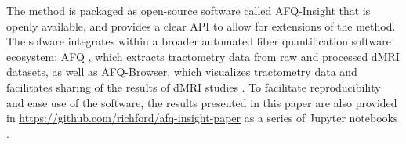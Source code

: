 The method is packaged as open-source software called AFQ-Insight that is openly
available, and provides a clear API to allow for extensions of the method. The
sofware integrates within a broader automated fiber quantification software
ecosystem: AFQ \cite{yeatman2012tract}, which extracts tractometry data from raw
and processed dMRI datasets, as well as AFQ-Browser, which visualizes
tractometry data and facilitates sharing of the results of dMRI studies
\cite{yeatman2018browser}. To facilitate reproducibility and ease use of the
software, the results presented in this paper are also provided in
\url{https://github.com/richford/afq-insight-paper} as a series of Jupyter
notebooks \cite{kluyver2016jupyter}.

